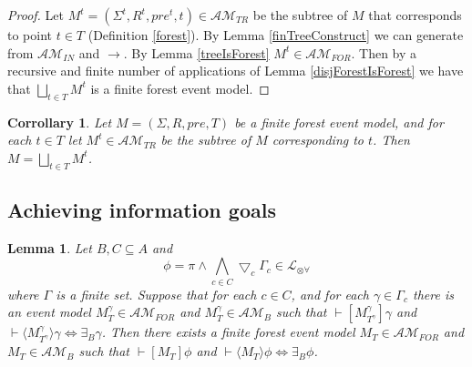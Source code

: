 \documentclass[12pt, a4paper, titlepage]{article}
\newtheorem{lemma}{Lemma}[subsection]
\newtheorem{corr}{Corrollary}[subsection]
\numberwithin{equation}{section}
\newcommand{\cover}{\bigtriangledown}
\newcommand{\sqex}[1]{[{#1}]}
\newcommand{\anex}[1]{\langle {#1} \rangle}
\newcommand{\lang}{\mathcal{L}}
\newcommand{\langArbAct}{\lang_{\otimes\forall}}
\newcommand{\eventClass}{\mathcal{AM}}
\newcommand{\insaneClass}{\eventClass_{IN}}
\newcommand{\treeClass}{\eventClass_{TR}}
\newcommand{\forestClass}{\eventClass_{FOR}}
\newcommand{\FIXME}{{\bf FIXME}}
\begin{document}
\begin{proof}
Let $M^t = (\Sigma^t, R^t, pre^t, t) \in \treeClass$ be the
subtree of $M$ that corresponds to point $t \in T$ (Definition \ref{forest}).
By Lemma \ref{finTreeConstruct} we can generate from $\insaneClass$ and $\to$.
By Lemma \ref{treeIsForest} $M^t \in \forestClass$.
Then by a recursive and finite number of applications of Lemma
\ref{disjForestIsForest} we have that $\bigsqcup_{t \in T} M^t$ is a finite
forest event model.
\end{proof}

\begin{corr} \label{forestConCorr}
Let $M = (\Sigma, R, pre, T)$ be a finite forest event model, and for each $t \in T$ let $M^t \in
\treeClass$ be the subtree of $M$ corresponding to $t$.
Then $M = \bigsqcup_{t \in T} M^t$.
\end{corr}

\subsection{Achieving information goals}


\begin{lemma} \label{coverFormulaAchievementK}
Let $B, C \subseteq A$ and
\[
\phi = \pi \land \bigwedge_{c \in C} \cover_c \Gamma_c \in \langArbAct
\]
where $\Gamma$ is a finite set.
Suppose that for each $c \in C$, and for each $\gamma \in \Gamma_c$ there is an event model
$M^\gamma_T \in \forestClass$ and $M^\gamma_T \in \eventClass_B$  such that
$\vdash \sqex{M^\gamma_{T^\gamma}} \gamma$ and $\vdash \anex{ M^\gamma_{T^\gamma} } \gamma \iff
\exists_B \gamma$.
Then there exists a finite forest event model $M_T \in \forestClass$ and $M_T \in \eventClass_B$
such that $\vdash \sqex{M_T}\phi$ and $\vdash \anex{ M_T } \phi \iff \exists_B \phi$.
\end{lemma}
\end{document}
